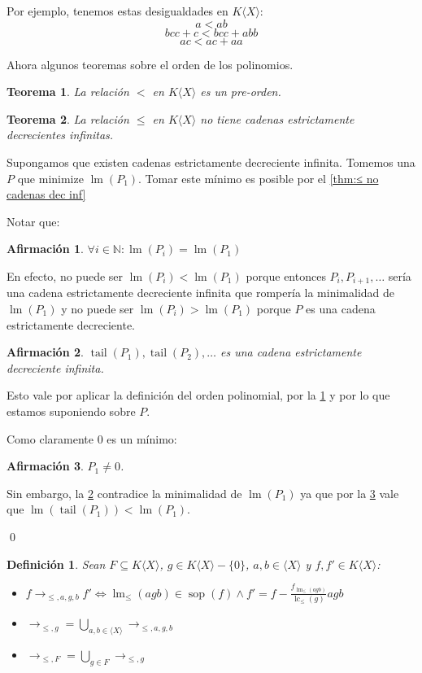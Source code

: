 \documentclass{amsbook} %
\theoremstyle{customstyle}
\newtheorem{definition}{Definición}[chapter]
\newtheorem{theorem}{Teorema}[chapter]
\renewenvironment{proof}[1][\proofname]{{\bfseries #1: }}{\qed} %
\theoremstyle{factstyle}
\newtheorem{fact}{Afirmación}[theorem]
\DeclareMathOperator{\sop}{sop}
\DeclareMathOperator{\lm}{lm}
\DeclareMathOperator{\lc}{lc}
\DeclareMathOperator{\tail}{tail}
\begin{document}
Por ejemplo, tenemos estas desigualdades en $K⟨X⟩$:
\[ a < ab \]
\[ bcc + c < bcc + abb \]
\[ ac < ac + aa \]

Ahora algunos teoremas sobre el orden de los polinomios.

\begin{theorem} La relación $<$ en $K⟨X⟩$ es un pre-orden.
\end{theorem}

\begin{theorem}\label{thm:≤ en KX no cadenas dec inf}
La relación $≤$ en $K⟨X⟩$ no tiene cadenas estrictamente decrecientes infinitas.
\end{theorem}
\begin{proof}
Supongamos que existen cadenas estrictamente decreciente infinita. Tomemos una $P$ que minimize $\lm(P_1)$. Tomar este mínimo es posible por el \cref{thm:≤ no cadenas dec inf}

Notar que:

\begin{fact}\label{fact:≤ en KX no cadenas dec inf:1} %
$∀i ∈ ℕ : \lm(P_i) = \lm(P_1)$
\end{fact}
En efecto, no puede ser $\lm(P_i) < \lm(P_1)$ porque entonces $P_i, P_{i + 1}, …$ sería una cadena estrictamente decreciente infinita que rompería la minimalidad de $\lm(P_1)$ y no puede ser $\lm(P_i) > \lm(P_1)$ porque $P$ es una cadena estrictamente decreciente.

\begin{fact}\label{fact:≤ en KX no cadenas dec inf:2}
$\tail(P_1), \tail(P_2), …$ es una cadena estrictamente decreciente infinita.
\end{fact}
Esto vale por aplicar la definición del orden polinomial, por la \cref{fact:≤ en KX no cadenas dec inf:1} y por lo que estamos suponiendo sobre $P$.

Como claramente $0$ es un mínimo:

\begin{fact}\label{fact:≤ en KX no cadenas dec inf:3}
$P_1 ≠ 0$.
\end{fact}

Sin embargo, la \cref{fact:≤ en KX no cadenas dec inf:2} contradice la minimalidad de $\lm(P_1)$ ya que por la \cref{fact:≤ en KX no cadenas dec inf:3} vale que $\lm(\tail(P_1)) < \lm(P_1)$.

\end{proof}

\begin{definition}
Sean $F ⊆ K⟨X⟩$, $g ∈ K⟨X⟩ - \{0\}$, $a, b ∈ ⟨X⟩$ y $f, f' ∈ K⟨X⟩$:
\begin{itemize}
\item $f →_{≤, a, g, b} f' ⇔ \lm_≤(agb) ∈ \sop(f) ∧ f' = f - \frac{f_{\lm_≤(agb)}}{\lc_≤(g)}agb$
\item $→_{≤, g} = ⋃_{a, b ∈ ⟨X⟩} →_{≤, a, g, b}$
\item $→_{≤, F} = ⋃_{g ∈ F} →_{≤, g}$
\end{itemize}
\end{definition}
\end{document}
